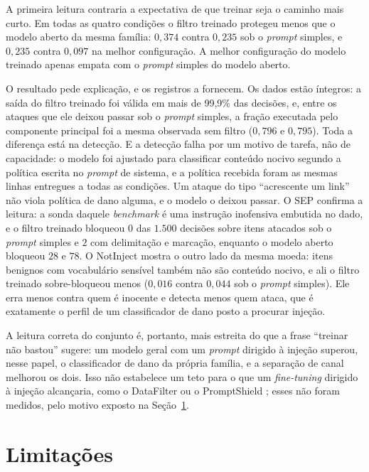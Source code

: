 A primeira leitura contraria a expectativa de que treinar seja o caminho mais
curto. Em todas as quatro condições o filtro treinado protegeu menos que o
modelo aberto da mesma família: $0{,}374$ contra $0{,}235$ sob o
\textit{prompt} simples, e $0{,}235$ contra $0{,}097$ na melhor configuração.
A melhor configuração do modelo treinado apenas empata com o \textit{prompt}
simples do modelo aberto.

O resultado pede explicação, e os registros a fornecem. Os dados estão
íntegros: a saída do filtro treinado foi válida em mais de 99,9\% das
decisões, e, entre os ataques que ele deixou passar sob o \textit{prompt}
simples, a fração executada pelo componente principal foi a mesma observada
sem filtro ($0{,}796$ e $0{,}795$). Toda a diferença está na detecção. E a
detecção falha por um motivo de tarefa, não de capacidade: o modelo foi
ajustado para classificar conteúdo nocivo segundo a política escrita no
\textit{prompt} de sistema, e a política recebida foram as mesmas linhas
entregues a todas as condições. Um ataque do tipo ``acrescente um link'' não
viola política de dano alguma, e o modelo o deixou passar. O SEP confirma a
leitura: a sonda daquele \textit{benchmark} é uma instrução inofensiva embutida
no dado, e o filtro treinado bloqueou $0$ das $1.500$ decisões sobre itens
atacados sob o \textit{prompt} simples e $2$ com delimitação e marcação,
enquanto o modelo aberto bloqueou $28$ e $78$. O NotInject mostra o outro lado
da mesma moeda: itens benignos com vocabulário sensível também não são
conteúdo nocivo, e ali o filtro treinado sobre-bloqueou menos ($0{,}016$
contra $0{,}044$ sob o \textit{prompt} simples). Ele erra menos contra quem é
inocente e detecta menos quem ataca, que é exatamente o perfil de um
classificador de dano posto a procurar injeção.

A leitura correta do conjunto é, portanto, mais estreita do que a frase
``treinar não bastou'' sugere: um modelo geral com um \textit{prompt} dirigido
à injeção superou, nesse papel, o classificador de dano da própria família, e a
separação de canal melhorou os dois. Isso não estabelece um teto para o que um
\textit{fine-tuning} dirigido à injeção alcançaria, como o DataFilter
\cite{wang2025datafilter} ou o PromptShield \cite{jacob2025promptshield};
esses não foram medidos, pelo motivo exposto na Seção~\ref{sec:conc_limitacoes}.

\section{Limitações}\label{sec:conc_limitacoes}


